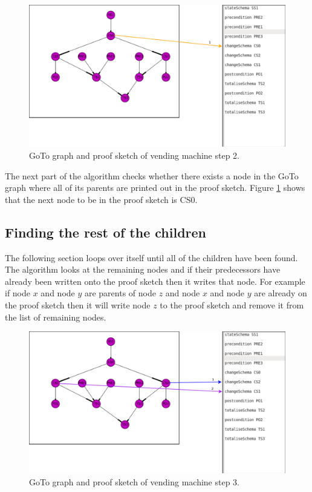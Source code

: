 \begin{figure}[H]
\includegraphics[scale=0.3]{Figures/skeleton/2.png}
\caption{GoTo graph and proof sketch of vending machine step 2.}
\label{fig:2}
\end{figure}

The next part of the algorithm checks whether there exists a node in the GoTo
graph where all of its parents are printed out in the proof sketch. Figure
\ref{fig:2} shows that the next node to be in the proof sketch is CS0. 

\subsection{Finding the rest of the children}
The following section loops over itself until all of the children have been found.
The algorithm looks at the remaining nodes and if their predecessors have already 
been written onto the proof sketch then it writes that node.
For example if node $x$ and node $y$ are parents of node $z$ and node $x$ and node $y$
are already on the proof sketch then it will write node $z$ to the proof sketch and
remove it from the list of remaining nodes.

\begin{figure}[H]
\includegraphics[scale=0.3]{Figures/skeleton/3.png}
\caption{GoTo graph and proof sketch of vending machine step 3.}
\label{fig:3}
\end{figure}

